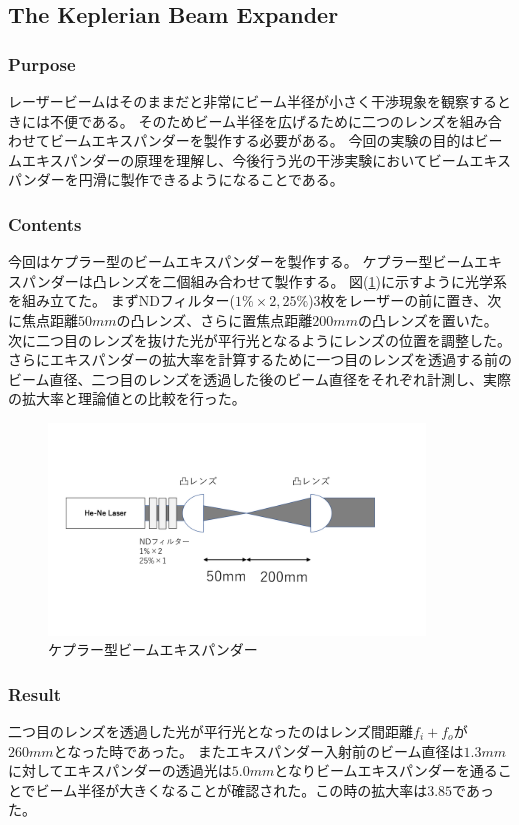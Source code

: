 \documentclass[11pt, a4paper]{jsarticle}
\begin{document}
\subsection{The Keplerian Beam Expander}
\subsubsection{Purpose}
レーザービームはそのままだと非常にビーム半径が小さく干渉現象を観察するときには不便である。
そのためビーム半径を広げるために二つのレンズを組み合わせてビームエキスパンダーを製作する必要がある。
今回の実験の目的はビームエキスパンダーの原理を理解し、今後行う光の干渉実験においてビームエキスパンダーを円滑に製作できるようになることである。
\subsubsection{Contents}
今回はケプラー型のビームエキスパンダーを製作する。
ケプラー型ビームエキスパンダーは凸レンズを二個組み合わせて製作する。
図(\ref{fig:three})に示すように光学系を組み立てた。
まずNDフィルター($1\%\times2,25\%$)3枚をレーザーの前に置き、次に焦点距離$50mm$の凸レンズ、さらに置焦点距離$200mm$の凸レンズを置いた。
次に二つ目のレンズを抜けた光が平行光となるようにレンズの位置を調整した。
さらにエキスパンダーの拡大率を計算するために一つ目のレンズを透過する前のビーム直径、二つ目のレンズを透過した後のビーム直径をそれぞれ計測し、実際の拡大率と理論値との比較を行った。
\begin{figure}[htbp]
 \begin{center}
  \includegraphics[width=100mm]{fig3.png}
 \end{center}
 \caption{ケプラー型ビームエキスパンダー}
 \label{fig:three}
\end{figure}

\subsubsection{Result}
二つ目のレンズを透過した光が平行光となったのはレンズ間距離$f_i + f_o$が$260mm$となった時であった。
またエキスパンダー入射前のビーム直径は$1.3mm$に対してエキスパンダーの透過光は$5.0mm$となりビームエキスパンダーを通ることでビーム半径が大きくなることが確認された。この時の拡大率は$3.85$であった。
\end{document}
